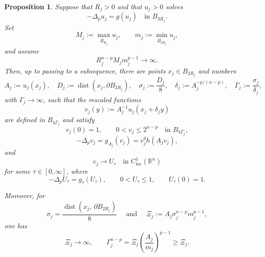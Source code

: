 \documentclass[reqno,12pt]{amsart}
\numberwithin{equation}{section}
\newtheorem{prop}[thm]{Proposition}
\theoremstyle{remark}
\newcommand{\R}{\mathbb R}
\newcommand{\loc}{\mathrm{loc}}
\newcommand{\dist}{\operatorname{dist}}
\begin{document}
\begin{prop} \label{prop:point-selection}
Suppose that $R_j>0$ and that $u_j>0$ solves
$$
-\Delta_pu_j=g(u_j)\quad\text{in }B_{3R_j}.
$$
Set
$$
M_j:=\max_{\overline{B_{R_j}}}u_j, 
\qquad m_j:=\min_{\overline{B_{2R_j}}}u_j, 
$$
and assume
\begin{equation}\label{eq:selection-assump}
R_j^{n-p}M_jm_j^{p-1}\to \infty.
\end{equation}
Then, up to passing to a subsequence, there are points
$x_j\in B_{2R_j}$ and numbers
$$
A_j:=u_j(x_j), \quad D_j:=\operatorname{dist}(x_j,\partial B_{2R_j}), \quad \sigma_j:=\frac{D_j}{8},\quad 
\delta_j:=A_j^{-p/(n-p)},\quad
\Gamma_j:=\frac{\sigma_j}{\delta_j},
$$
with $\Gamma_j\to\infty$, such that the rescaled functions
\begin{equation}\label{eq:defn-vj}
    v_j(y):=A_j^{-1}u_j(x_j+\delta_jy)
\end{equation}
are defined in $B_{4\Gamma_j}$ and satisfy
\begin{equation}\label{eq:vj-normalization}
v_j(0)=1, \qquad 0<v_j\le2^{n-p}\quad\text{in }B_{4\Gamma_j},
\end{equation}
\begin{equation}\label{eq:vj-equation}
-\Delta_pv_j=g_{A_j}(v_j)=v_j^qh(A_jv_j),
\end{equation}
and
\begin{equation}\label{eq:vj-limit}
v_j\to  U_\tau \quad\text{in }C^1_{\loc}(\R^n)
\end{equation}
for some $\tau\in[0,\infty]$, where
\begin{equation}\label{eq:Utau-normalized}
-\Delta_pU_\tau=g_\tau(U_\tau), \qquad 0<U_\tau\le 1, \qquad U_\tau(0)=1.
\end{equation}

Moreover, for 
\begin{equation}\label{eq:defn-xi}
\sigma_j=\frac{\dist(x_j,\,\partial B_{2R_j})}{8} \quad \text{ and }\quad \Xi_j:=A_j\sigma_j^{n-p}m_j^{p-1},
\end{equation}
one has
\begin{equation}\label{eq:Xi-Gamma}
\Xi_j\to\infty, \qquad 
\Gamma_j^{n-p} =\Xi_j\left(\frac{A_j}{m_j}\right)^{p-1} \ge\Xi_j.
\end{equation}
\end{prop}
\end{document}
